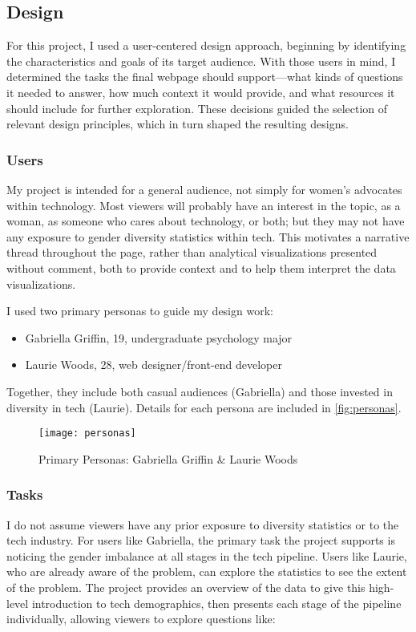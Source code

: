 \subsection{Design}\label{sec:design}
For this project, I used a user-centered design approach, beginning by identifying the characteristics and goals of its target audience. With those users in mind, I determined the tasks the final webpage should support---what kinds of questions it needed to answer, how much context it would provide, and what resources it should include for further exploration. These decisions guided the selection of relevant design principles, which in turn shaped the resulting designs.

\subsubsection{Users}\label{users}
My project is intended for a general audience, not simply for women's advocates within technology. Most viewers will probably have an interest in the topic, as a woman, as someone who cares about technology, or both; but they may not have any exposure to gender diversity statistics within tech. This motivates a narrative thread throughout the page, rather than analytical visualizations presented without comment, both to provide context and to help them interpret the data visualizations.

I used two primary personas to guide my design work:
\begin{itemize}
  \item Gabriella Griffin, 19, undergraduate psychology major
  \item Laurie Woods, 28, web designer/front-end developer
\end{itemize}
Together, they include both casual audiences (Gabriella) and those invested in diversity in tech (Laurie). Details for each persona are included in \autoref{fig:personas}.

\begin{figure}
  \texttt{[image: personas]}
  \caption{Primary Personas: Gabriella Griffin \& Laurie Woods}\label{fig:personas}
\end{figure}

\subsubsection{Tasks}\label{tasks}
I do not assume viewers have any prior exposure to diversity statistics or to the tech industry. For users like Gabriella, the primary task the project supports is noticing the gender imbalance at all stages in the tech pipeline. Users like Laurie, who are already aware of the problem, can explore the statistics to see the extent of the problem. The project provides an overview of the data to give this high-level introduction to tech demographics, then presents each stage of the pipeline individually, allowing viewers to explore questions like:

